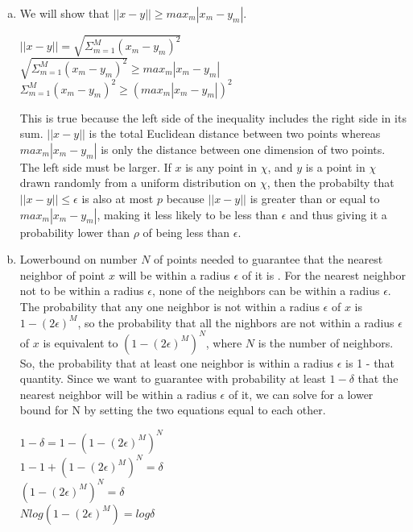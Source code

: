 \documentclass[11pt]{article}
\begin{document}
\begin{enumerate}[a.]
\item We will show that $||x - y|| \geq max_m|x_m - y_m|$.
\begin{center}
$||x - y|| = \sqrt{\Sigma_{m = 1}^{M} (x_m - y_m)^2} $ \\
$\sqrt{\Sigma_{m = 1}^{M} (x_m - y_m)^2} \geq max_m|x_m - y_m|$ \\
$\Sigma_{m = 1}^{M} (x_m - y_m)^2 \geq (max_m|x_m - y_m|)^2$
\end{center}
This is true because the left side of the inequality includes the right side in its sum. $|| x - y ||$ is the total Euclidean distance between two points whereas $max_m|x_m - y_m|$ is only the distance between one dimension of two points. The left side must be larger.
\newline \newline
If $x$ is any point in $\chi$, and $y$ is a point in $\chi$ drawn randomly from a uniform distribution on $\chi$, then the probabilty that $||x - y|| \leq \epsilon$ is also at most $p$ because $||x - y||$ is greater than or equal to $max_m|x_m - y_m|$, making it less likely to be less than $\epsilon$ and thus giving it a probability lower than $\rho$ of being less than $\epsilon$.
\item Lowerbound on number $N$ of points needed to guarantee that the nearest neighbor of point $x$
 will be within a radius $\epsilon$ of it is .
\newline
For the nearest neighbor not to be within a radius $\epsilon$, none of the neighbors can be within a radius $\epsilon$. The probability that any one neighbor is not within a radius $\epsilon$ of $x$ is $1 - (2\epsilon)^M$, so the probability that all the nighbors are not within a radius $\epsilon$ of $x$ is equivalent to $(1 - (2\epsilon)^M)^N$, where $N$ is the number of neighbors. So, the probability that at least one neighbor is within a radius $\epsilon$ is 1 - that quantity. Since we want to guarantee with probability at least $1 - \delta$ that the nearest neighbor will be within a radius $\epsilon$ of it, we can solve for a lower bound for N by setting the two equations equal to each other.
\begin{center}
$1 - \delta = 1 - (1 - (2\epsilon)^M)^N$ \\
$1 - 1 + (1 - (2\epsilon)^M)^N = \delta$ \\
$(1 - (2\epsilon)^M)^N = \delta $ \\
$Nlog(1 - (2\epsilon)^M) = log\delta$ \\

\end{center}
\end{enumerate}
\end{document}
